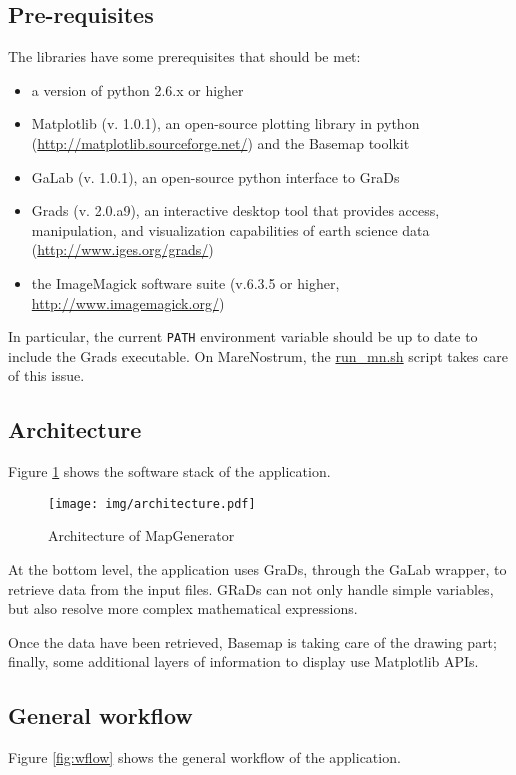 \documentclass[11pt]{article}
\newcommand{\grads}{GRaDs}
\newcommand{\mn}{MareNostrum}
\newcommand{\mg}{MapGenerator}
\begin{document}
\subsection{Pre-requisites} 
\label{ssec:prereq}
The libraries have some prerequisites that should be met: 
\begin{itemize}
\item a version of python 2.6.x or higher 
\item Matplotlib (v. 1.0.1), an open-source plotting library in python (\url{http://matplotlib.sourceforge.net/}) and the Basemap toolkit
\item GaLab (v. 1.0.1), an open-source python interface to GraDs 
\item Grads (v. 2.0.a9), an interactive desktop tool that provides access, manipulation, and visualization capabilities of earth science data (\url{http://www.iges.org/grads/})
\item the ImageMagick software suite (v.6.3.5 or higher, \url{http://www.imagemagick.org/}) 
\end{itemize} 

In particular, the current \texttt{PATH} environment variable should be up to date to include the Grads executable. On \mn{}, the \url{run_mn.sh} script takes care of this issue. 

\subsection{Architecture} 
Figure \ref{fig:arq} shows the software stack of the application. 

\begin{figure}[H]
\begin{center}
\texttt{[image: img/architecture.pdf]}
\end{center}
\caption{Architecture of \mg{}}
\label{fig:arq}
\end{figure}

At the bottom level, the application uses GraDs, through the GaLab wrapper, to retrieve data from the input files. \grads{} can not only handle simple variables, but also resolve more complex mathematical expressions. 

Once the data have been retrieved, Basemap is taking care of the drawing part; finally, some additional layers of information to display use Matplotlib APIs. 

\subsection{General workflow}
Figure \ref{fig:wflow} shows the general workflow of the application. 
\end{document}
